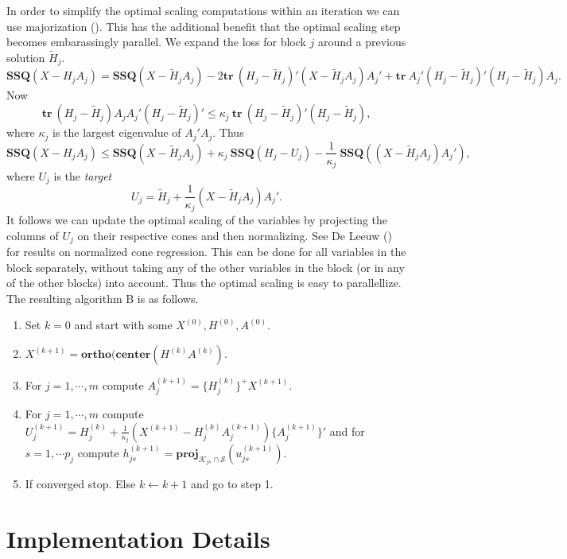 \documentclass[
  12pt,
  letterpaper,
]{scrbook}
\providecommand{\tightlist}{%
  \setlength{\itemsep}{0pt}\setlength{\parskip}{0pt}}
\begin{document}
In order to simplify the optimal scaling computations within an
iteration we can use majorization
(). This has the
additional benefit that the optimal scaling step becomes embarassingly
parallel. We expand the loss for block \(j\) around a previous solution
\(\tilde H_j\). \[
\mathbf{SSQ}(X-H_jA_j)=
\mathbf{SSQ}(X-\tilde H_jA_j)-2\mathbf{tr}\ (H_j-\tilde H_j)'(X-\tilde H_jA_j)A_j'
+\mathbf{tr}\ A_j'(H_j-\tilde H_j)'(H_j-\tilde H_j)A_j.
\] Now \[
\mathbf{tr}\ (H_j-\tilde H_j)A_jA_j'(H_j-\tilde H_j)'\leq\kappa_j\ \mathbf{tr}\ (H_j-\tilde H_j)'(H_j-\tilde H_j),
\] where \(\kappa_j\) is the largest eigenvalue of \(A_j'A_j\). Thus \[
\mathbf{SSQ}(X-H_jA_j)\leq\mathbf{SSQ}(X-\tilde H_jA_j)+\kappa_j\ \mathbf{SSQ}(H_j-U_j)-\frac{1}{\kappa_j}\ \mathbf{SSQ}((X-\tilde H_jA_j)A_j'),
\] where \(U_j\) is the \emph{target} \[
U_j=\tilde H_j+\frac{1}{\kappa_j}(X-\tilde H_jA_j)A_j'.\tag{3}
\] It follows we can update the optimal scaling of the variables by
projecting the columns of \(U_j\) on their respective cones and then
normalizing. See De Leeuw () for
results on normalized cone regression. This can be done for all
variables in the block separately, without taking any of the other
variables in the block (or in any of the other blocks) into account.
Thus the optimal scaling is easy to parallellize. The resulting
algorithm B is as follows.

\begin{enumerate}
\def\labelenumi{\arabic{enumi}.}
\setcounter{enumi}{-1}
\tightlist
\item
  Set \(k=0\) and start with some \(X^{(0)},H^{(0)},A^{(0)}\).
\item
  \(X^{(k+1)}=\mathbf{ortho}(\mathbf{center}(H^{(k)}A^{(k)})\).
\item
  For \(j=1,\cdots,m\) compute \(A_j^{(k+1)}=\{H_j^{(k)}\}^+X^{(k+1)}\).
\item
  For \(j=1,\cdots,m\) compute
  \(U_j^{(k+1)}=H_j^{(k)}+\frac{1}{\kappa_j}(X^{(k+1)}-H_j^{(k)}A_j^{(k+1)})\{A_j^{(k+1)}\}'\)
  and for \(s=1,\cdots p_j\) compute
  \(h_{js}^{(k+1)}=\mathbf{proj}_{\mathcal{K}_{js}\cap\mathcal{S}}(u_{js}^{(k+1)})\).
\item
  If converged stop. Else \(k\leftarrow k+1\) and go to step 1.
\end{enumerate}

\section{Implementation Details}\label{implementation-details}
\end{document}
